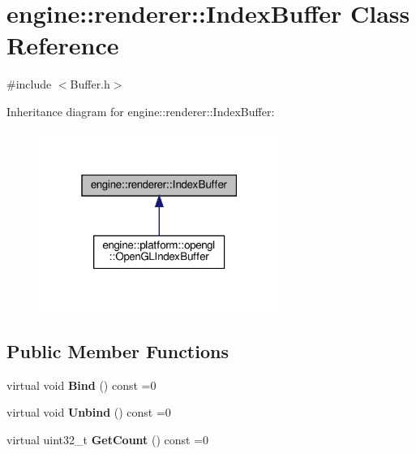 \hypertarget{classengine_1_1renderer_1_1IndexBuffer}{}\section{engine\+:\+:renderer\+:\+:Index\+Buffer Class Reference}
\label{classengine_1_1renderer_1_1IndexBuffer}


{\ttfamily \#include $<$Buffer.\+h$>$}



Inheritance diagram for engine\+:\+:renderer\+:\+:Index\+Buffer\+:
\nopagebreak
\begin{figure}[H]
\begin{center}
\leavevmode
\includegraphics[width=223pt]{classengine_1_1renderer_1_1IndexBuffer__inherit__graph}
\end{center}
\end{figure}
\subsection*{Public Member Functions}
\begin{DoxyCompactItemize}
\item
\mbox{\label{classengine_1_1renderer_1_1IndexBuffer_a7c52dbc4b44f40576d5ea779adab9ff1}}
virtual void {\bfseries Bind} () const =0
\item
\mbox{\label{classengine_1_1renderer_1_1IndexBuffer_a34fa5a15f323617a82ffc1641312b214}}
virtual void {\bfseries Unbind} () const =0
\item
\mbox{\label{classengine_1_1renderer_1_1IndexBuffer_a231d15b46a8b932b3a03b6be95256bac}}
virtual uint32\+\_\+t {\bfseries Get\+Count} () const =0
\end{DoxyCompactItemize}
